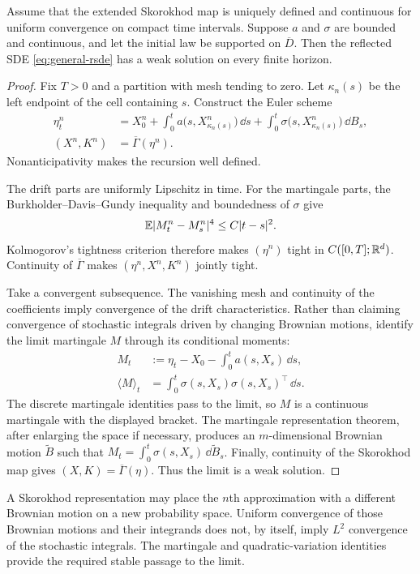 \begin{theorem}
Assume that the extended Skorokhod map is uniquely defined and continuous for
uniform convergence on compact time intervals. Suppose $a$ and $\sigma$ are
bounded and continuous, and let the initial law be supported on
$\overline D$. Then the reflected SDE \eqref{eq:general-rsde} has a weak
solution on every finite horizon.
\end{theorem}

\begin{proof}
Fix $T>0$ and a partition with mesh tending to zero. Let
$\kappa_n(s)$ be the left endpoint of the cell containing $s$. Construct the
Euler scheme
\begin{align*}
  \eta^n_t
    &=X_0^n+\int_0^t a\bigl(s,X^n_{\kappa_n(s)}\bigr)\,\dd s
      +\int_0^t\sigma\bigl(s,X^n_{\kappa_n(s)}\bigr)\,\dd B_s,\\
  (X^n,K^n)&=\overline\Gamma(\eta^n).
\end{align*}
Nonanticipativity makes the recursion well defined.

The drift parts are uniformly Lipschitz in time. For the martingale parts,
the Burkholder--Davis--Gundy inequality and boundedness of $\sigma$ give
\[
  \mathbb E|M^n_t-M^n_s|^4\leq C|t-s|^2.
\]
Kolmogorov's tightness criterion therefore makes $(\eta^n)$ tight in
$C([0,T];\mathbb R^d)$. Continuity of $\overline\Gamma$ makes
$(\eta^n,X^n,K^n)$ jointly tight.

Take a convergent subsequence. The vanishing mesh and continuity of the
coefficients imply convergence of the drift characteristics. Rather than
claiming convergence of stochastic integrals driven by changing Brownian
motions, identify the limit martingale $M$ through its conditional moments:
\begin{align*}
  M_t&:=\eta_t-X_0-\int_0^t a(s,X_s)\,\dd s,\\
  \langle M\rangle_t
    &=\int_0^t\sigma(s,X_s)\sigma(s,X_s)^\top\,\dd s.
\end{align*}
The discrete martingale identities pass to the limit, so $M$ is a continuous
martingale with the displayed bracket. The martingale representation theorem,
after enlarging the space if necessary, produces an $m$-dimensional Brownian
motion $\widetilde B$ such that
$M_t=\int_0^t\sigma(s,X_s)\,\dd\widetilde B_s$. Finally, continuity of the
Skorokhod map gives $(X,K)=\overline\Gamma(\eta)$. Thus the limit is a weak
solution.
\end{proof}

\begin{remark}
A Skorokhod representation may place the $n$th approximation with a different
Brownian motion on a new probability space. Uniform convergence of those
Brownian motions and their integrands does not, by itself, imply
$L^2$ convergence of the stochastic integrals. The martingale and quadratic-variation identities provide the required stable
passage to the limit.
\end{remark}

